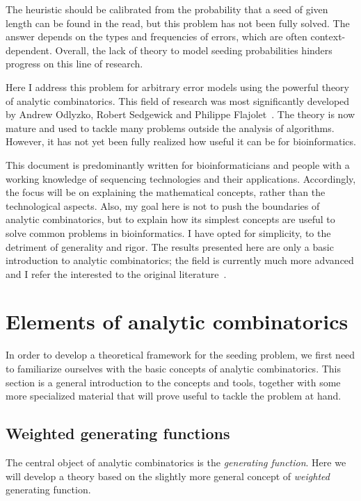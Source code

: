 \documentclass{article}
\begin{document}
The heuristic should be calibrated from the probability that a seed of
given length can be found in the read, but this problem has not been fully
solved. The answer depends on the types and frequencies of errors, which
are often context-dependent. Overall, the lack of theory to model seeding
probabilities hinders progress on this line of research.

Here I address this problem for arbitrary error models using the powerful
theory of analytic combinatorics. This field of research was most
significantly developed by Andrew Odlyzko, Robert Sedgewick and Philippe
Flajolet~\cite{flajolet1990singularity, flajolet1996introduction,
Flajolet:2009:AC:1506267}. The theory is now mature and used to tackle
many problems outside the analysis of algorithms. However, it has not yet
been fully realized how useful it can be for bioinformatics.

This document is predominantly written for bioinformaticians and people
with a working knowledge of sequencing technologies and their
applications. Accordingly, the focus will be on explaining the
mathematical concepts, rather than the technological aspects. Also, my
goal here is not to push the boundaries of analytic combinatorics, but to
explain how its simplest concepts are useful to solve common problems in
bioinformatics. I have opted for simplicity, to the detriment of
generality and rigor. The results presented here are only a basic
introduction to analytic combinatorics; the field is currently much more
advanced and I refer the interested to the original
literature~\cite{Flajolet:2009:AC:1506267}.

\section{Elements of analytic combinatorics}
\label{sec:anal}

In order to develop a theoretical framework for the seeding problem, we
first need to familiarize ourselves with the basic concepts of analytic
combinatorics. This section is a general introduction to the concepts and
tools, together with some more specialized material that will
prove useful to tackle the problem at hand.

\subsection{Weighted generating functions}
\label{subsec:WGF}

The central object of analytic combinatorics is the \emph{generating
function}. Here we will develop a theory based on the slightly more
general concept of \emph{weighted} generating function.
\end{document}

